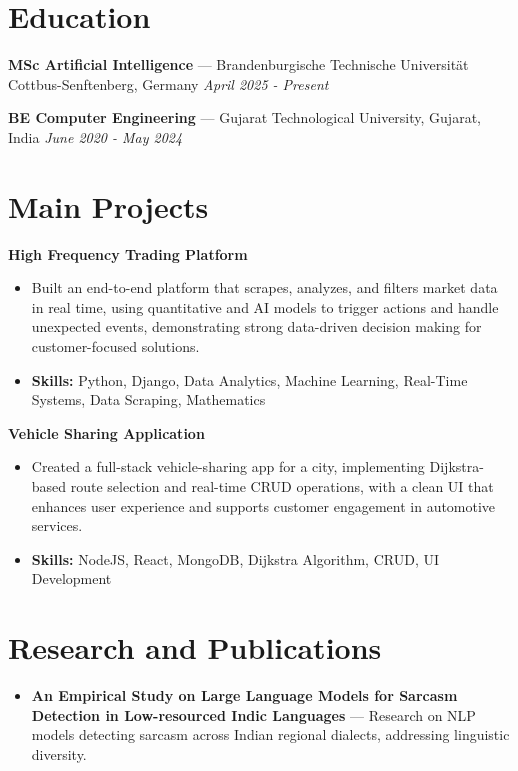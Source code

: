 \documentclass[a4paper,10pt]{article}
\begin{document}
\section*{Education}
\textbf{MSc Artificial Intelligence} — Brandenburgische Technische Universität Cottbus-Senftenberg, Germany \hfill \textit{April 2025 - Present}\par
\vspace{1.5pt}
\textbf{BE Computer Engineering} — Gujarat Technological University, Gujarat, India \hfill \textit{June 2020 - May 2024}\par

\section*{Main Projects}
\textbf{High Frequency Trading Platform}\par
\vspace{1pt}
\begin{itemize}
  \item Built an end-to-end platform that scrapes, analyzes, and filters market data in real time, using quantitative and AI models to trigger actions and handle unexpected events, demonstrating strong data-driven decision making for customer-focused solutions.
  \item \textbf{Skills:} Python, Django, Data Analytics, Machine Learning, Real-Time Systems, Data Scraping, Mathematics
\end{itemize}
\vspace{3pt}
\textbf{Vehicle Sharing Application}\par
\vspace{1pt}
\begin{itemize}
  \item Created a full-stack vehicle-sharing app for a city, implementing Dijkstra-based route selection and real-time CRUD operations, with a clean UI that enhances user experience and supports customer engagement in automotive services.
  \item \textbf{Skills:} NodeJS, React, MongoDB, Dijkstra Algorithm, CRUD, UI Development
\end{itemize}

\section*{Research and Publications}
\begin{itemize}
\item \textbf{An Empirical Study on Large Language Models for Sarcasm Detection in Low-resourced Indic Languages} — Research on NLP models detecting sarcasm across Indian regional dialects, addressing linguistic diversity.
\end{itemize}
\end{document}
